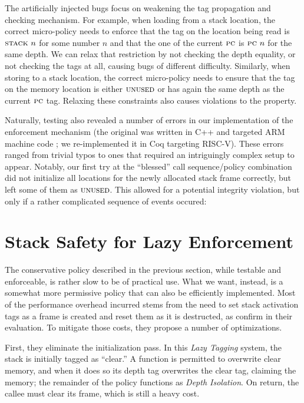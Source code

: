 \documentclass[acmsmall,review,anonymous]{acmart}\settopmatter{printfolios=true,printccs=false,printacmref=false}
\begin{document}
The artificially injected bugs focus on weakening the tag propagation
and checking mechanism. 
%
For example, when loading from a stack location, the correct
micro-policy needs to enforce that the tag on the location being read
is $\textsc{stack} ~ n$ for some number $n$ and that the one of the
current $\textsc{pc}$ is $\textsc{pc} ~ n$ for the same depth. We can relax
that restriction by not checking the depth equality, or not checking
the tags at all, causing bugs of different difficulty.
%
Similarly, when storing to a stack location, the correct micro-policy
needs to ensure that the tag on the memory location is either
$\textsc{unused}$ or has again the same depth as the current $\textsc{pc}$
tag. Relaxing these constraints also causes violations to the
property.

Naturally, testing also revealed a number of errors in our
implementation of the enforcement mechanism (the original was written in C++
and targeted ARM machine code
; we re-implemented it in Coq targeting
RISC-V).  These errors ranged from trivial typos to
ones that required an
intriguingly complex setup to appear.  Notably, our first try at the
``blessed'' call sequence/policy combination did not initialize all
locations for the newly allocated stack frame correctly, but left some
of them as $\textsc{unused}$. This allowed for a potential integrity
violation, but only if a rather complicated sequence of events
occured: 

\section{Stack Safety for Lazy Enforcement}
\label{sec:lazy}

The conservative policy described in the previous section, while
testable and enforceable, is rather slow to be of practical use. What
we want, instead, is a somewhat more permissive policy that can also
be efficiently implemented. Most of the performance overhead incurred
stems from the need to set stack activation tags as a frame is created
and reset them as it is destructed, as
\citet{DBLP:conf/sp/RoesslerD18} confirm in their evaluation. To
mitigate those costs, they propose a number of optimizations.

First, they eliminate the initialization pass. In this {\em Lazy Tagging}
system, the stack is initially tagged as ``clear.'' A function is permitted
to overwrite clear memory, and when it does so its depth tag overwrites
the clear tag, claiming the memory; the remainder of the policy functions
as {\em Depth Isolation}. On return, the callee must clear its frame, which
is still a heavy cost.
\end{document}
